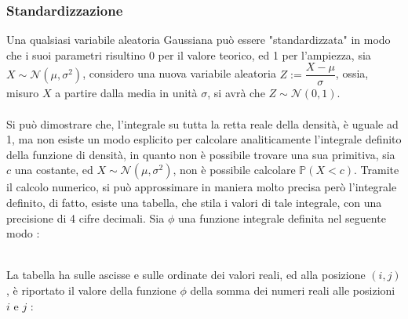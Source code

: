 \documentclass[12pt, letterpaper]{article}
\newcommand{\acc}{\\\hphantom{}\\}
\newcommand{\Prob}{{\mathbb P}}
\begin{document}
\subsubsection{Standardizzazione}
Una qualsiasi variabile aleatoria Gaussiana può essere "standardizzata" in modo che i suoi 
parametri risultino 0 per il valore teorico, ed 1 per l'ampiezza, sia \(X\sim \mathcal{N}(\mu,\sigma^2)\), 
considero una nuova variabile aleatoria \(Z:=\dfrac{X-\mu}{\sigma}\), ossia, misuro \(X\) a partire 
dalla media in unità \(\sigma\), si avrà che \(Z\sim \mathcal{N}(0,1)\).\acc Si può dimostrare che, 
l'integrale su tutta la retta reale della densità, è uguale ad 1, ma non esiste un modo esplicito 
per calcolare analiticamente l'integrale definito della funzione di densità, in quanto non è 
possibile trovare una sua primitiva, sia \(c\) una costante,
ed  \(X\sim \mathcal{N}(\mu,\sigma^2)\), non è possibile calcolare \(\Prob(X<c)\).
Tramite il calcolo numerico, si può approssimare in maniera molto precisa però l'integrale definito, di fatto, 
esiste una tabella, che stila i valori di tale integrale, con una precisione di 4 cifre decimali. Sia 
\(\phi\) una funzione integrale definita nel seguente modo :\begin{figure}[h]
\end{figure}
\\
La tabella ha sulle ascisse e sulle ordinate dei valori reali, ed alla posizione \((i,j)\), è riportato 
il valore della funzione \(\phi\) della somma dei numeri reali alle posizioni \(i\) e \(j\) :
\end{document}
